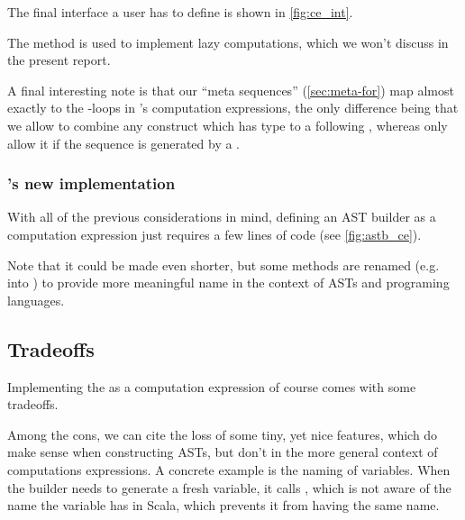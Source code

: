 The final interface a user has to define is shown in \cref{fig:ce_int}.
\begin{figure*}[p]

\caption{The interface of a computation expression builder.}
\label{fig:ce_int}
\end{figure*}
The  method is used to implement lazy computations, which we won't discuss in the present report.

A final interesting note is that our ``meta sequences'' (\cref{sec:meta-for}) map almost exactly to the -loops in \Fsharp{}'s computation expressions, 
the only difference being that we allow to combine any construct which has type  to a following , whereas \Fsharp{} only allow it if the sequence is generated by a .

\subsubsection{'s new implementation}
With all of the previous considerations in mind,
defining an AST builder as a computation expression just requires a few lines of code (see \cref{fig:astb_ce}).
\begin{figure*}[p]

\caption{AST builder as a computation expression.}
\label{fig:astb_ce}
\end{figure*}
Note that it could be made even shorter, 
but some methods are renamed (e.g.  into ) to provide more meaningful name in the context of ASTs and programing languages.

\subsection{Tradeoffs}
Implementing the  as a computation expression of course comes with some tradeoffs.

Among the cons, we can cite the loss of some tiny, yet nice features, which do make sense when constructing ASTs, but don't in the more general context of computations expressions.
A concrete example is the naming of variables.
When the builder needs to generate a fresh variable, it calls , which is not aware of the name the variable has in Scala, which prevents it from having the same name.

